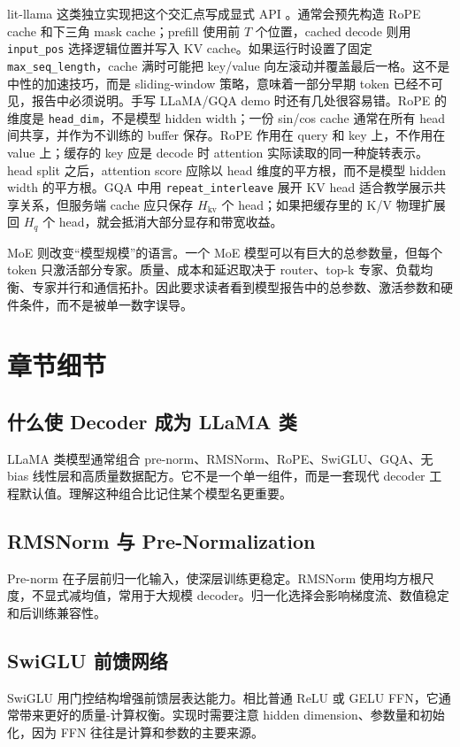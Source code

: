 \documentclass[UTF8,zihao=-4,openany]{ctexbook}
\begin{document}
lit-llama 这类独立实现把这个交汇点写成显式 API \cite{lightning2023litllama}。通常会预先构造 RoPE cache 和下三角 mask cache；prefill 使用前 $T$ 个位置，cached decode 则用 \texttt{input\_pos} 选择逻辑位置并写入 KV cache。如果运行时设置了固定 \texttt{max\_seq\_length}，cache 满时可能把 key/value 向左滚动并覆盖最后一格。这不是中性的加速技巧，而是 sliding-window 策略，意味着一部分早期 token 已经不可见，报告中必须说明。手写 LLaMA/GQA demo 时还有几处很容易错。RoPE 的维度是 \texttt{head\_dim}，不是模型 hidden width；一份 sin/cos cache 通常在所有 head 间共享，并作为不训练的 buffer 保存。RoPE 作用在 query 和 key 上，不作用在 value 上；缓存的 key 应是 decode 时 attention 实际读取的同一种旋转表示。head split 之后，attention score 应除以 head 维度的平方根，而不是模型 hidden width 的平方根。GQA 中用 \texttt{repeat\_interleave} 展开 KV head 适合教学展示共享关系，但服务端 cache 应只保存 $H_{\mathrm{kv}}$ 个 head；如果把缓存里的 K/V 物理扩展回 $H_q$ 个 head，就会抵消大部分显存和带宽收益。

MoE 则改变“模型规模”的语言。一个 MoE 模型可以有巨大的总参数量，但每个 token 只激活部分专家。质量、成本和延迟取决于 router、top-k 专家、负载均衡、专家并行和通信拓扑。因此要求读者看到模型报告中的总参数、激活参数和硬件条件，而不是被单一数字误导。

\section{章节细节}
\subsection{什么使 Decoder 成为 LLaMA 类}
LLaMA 类模型通常组合 pre-norm、RMSNorm、RoPE、SwiGLU、GQA、无 bias 线性层和高质量数据配方。它不是一个单一组件，而是一套现代 decoder 工程默认值。理解这种组合比记住某个模型名更重要。

\subsection{RMSNorm 与 Pre-Normalization}
Pre-norm 在子层前归一化输入，使深层训练更稳定。RMSNorm 使用均方根尺度，不显式减均值，常用于大规模 decoder。归一化选择会影响梯度流、数值稳定和后训练兼容性。

\subsection{SwiGLU 前馈网络}
SwiGLU 用门控结构增强前馈层表达能力。相比普通 ReLU 或 GELU FFN，它通常带来更好的质量-计算权衡。实现时需要注意 hidden dimension、参数量和初始化，因为 FFN 往往是计算和参数的主要来源。
\end{document}
